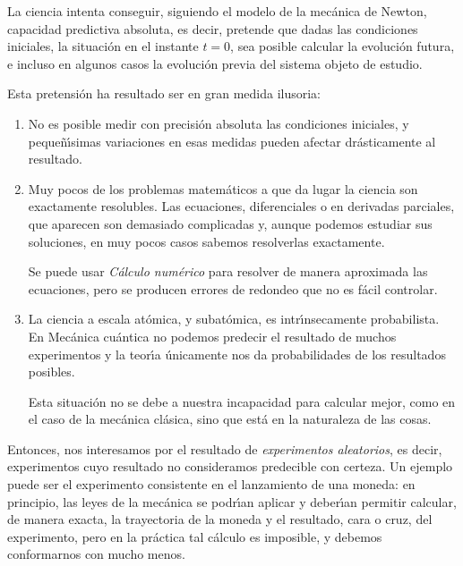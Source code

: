 
La ciencia intenta conseguir, siguiendo el modelo de la mec\'anica de Newton,
capacidad predictiva absoluta, es decir, pretende que dadas las condiciones
iniciales, la situaci\'on en el instante $t=0$, sea posible calcular la
evoluci\'on futura, e incluso en algunos casos la evoluci\'on previa del 
sistema objeto de estudio. 

Esta pretensi\'on ha resultado ser en gran medida  ilusoria:
\begin{enumerate}
 \item No es posible medir con precisi\'on absoluta las condiciones iniciales, y
peque\~n\'{\i}simas variaciones  en esas medidas  pueden afectar
dr\'asticamente al resultado.

\item Muy pocos de los problemas matem\'aticos a que da lugar la ciencia son
exactamente resolubles. Las ecuaciones,  diferenciales o en derivadas parciales,
que aparecen son demasiado complicadas y,  aunque podemos estudiar sus
soluciones, en muy pocos casos sabemos resolverlas exactamente. 

Se puede usar {\itshape C\'alculo num\'erico} para resolver de manera aproximada
las ecuaciones, pero se producen errores de redondeo que  no es f\'acil
controlar.

\item La ciencia a escala at\'omica, y subat\'omica, es intr\'{\i}nsecamente
probabilista. En Mec\'anica cu\'antica no podemos predecir el resultado de
muchos experimentos y la teor\'{\i}a \'unicamente nos da probabilidades de los
resultados posibles. 

Esta situaci\'on no se debe a nuestra incapacidad para calcular mejor, como en
el caso de la mec\'anica cl\'asica, sino que est\'a en la naturaleza de las
cosas.
 
 \end{enumerate}



Entonces, nos interesamos por el resultado de {\itshape experimentos
aleatorios}, es decir,  experimentos cuyo resultado no consideramos predecible
con certeza. Un ejemplo puede ser el experimento consistente en el lanzamiento
de una moneda: en principio, las leyes de la mec\'anica se podr\'{\i}an aplicar
y deber\'{\i}an permitir calcular,  de manera exacta,  la trayectoria de la
moneda y el resultado, cara o cruz, del experimento, pero en la pr\'actica tal
c\'alculo es imposible, y debemos conformarnos con
mucho menos. 

